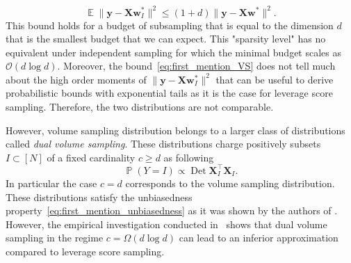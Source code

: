 \documentclass[twoside,11pt]{book}
\numberwithin{theorem}{chapter}
\numberwithin{definition}{chapter}
\numberwithin{proposition}{chapter}
\numberwithin{corollary}{chapter}
\numberwithin{example}{chapter}
\numberwithin{lemma}{chapter}
\numberwithin{assumption}{chapter}
\numberwithin{equation}{chapter}
\numberwithin{figure}{chapter}
\DeclareMathOperator{\Det}{Det}
\DeclareMathOperator{\Tran}{\intercal}
\DeclareMathOperator{\EX}{\mathbb{E}}
\DeclareMathOperator{\Prb}{\mathbb{P}}
\begin{document}
\begin{equation}\label{eq:first_mention_VS}
\EX \|\bm{y}-\bm{X}\bm{w}_{I}^{*}\|^{2} \leq (1+d) \|\bm{y} - \bm{X}\bm{w}^{*}\|^{2}.
\end{equation} 
This bound holds for a budget of subsampling that is equal to the dimension $d$ that is the smallest budget that we can expect. This "sparsity level" has no equivalent under independent sampling for which the minimal budget scales as $\mathcal{O}(d \log d)$. Moreover, the bound~\eqref{eq:first_mention_VS} does not tell much about the high order moments of $\|\bm{y}-\bm{X}\bm{w}_{I}^{*}\|^{2}$ that can be useful to derive probabilistic bounds with exponential tails as it is the case for leverage score sampling. 
Therefore, the two distributions are not comparable.

However, volume sampling distribution belongs to a larger class of distributions called \emph{dual volume sampling}. These distributions charge positively subsets $I \subset [N]$ of a fixed cardinality $c \geq d$ as following
\begin{equation}\label{eq:second_mention_volume_sampling}
\Prb(Y = I) \propto \Det \bm{X}_{I}^{\Tran} \bm{X}_{I}.
\end{equation} 
In particular the case $c = d$ corresponds to the volume sampling distribution. These distributions satisfy the unbiasedness property~\eqref{eq:first_mention_unbiasedness} as it was shown by the authors of \citep{DeWa17}. However, the empirical investigation conducted in~\citep{DeWaHs18} shows that dual volume sampling in the regime $c = \Omega(d \log d)$ can lead to an inferior approximation compared to leverage score sampling. 


\end{document}
